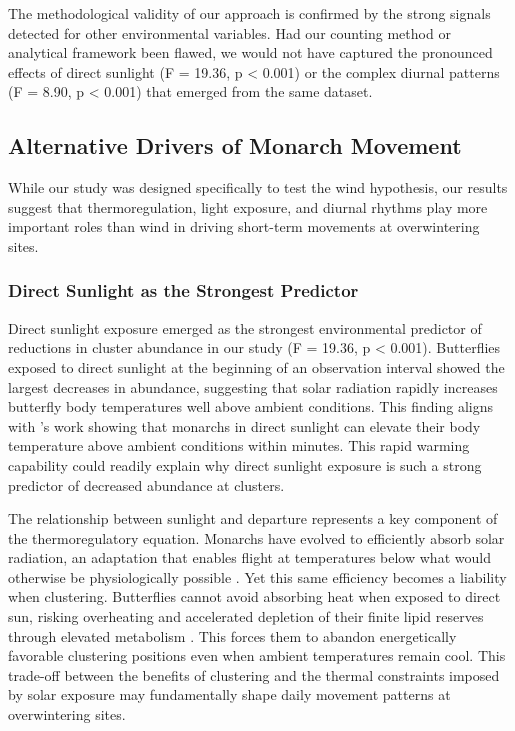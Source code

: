 The methodological validity of our approach is confirmed by the strong signals detected for other environmental variables. Had our counting method or analytical framework been flawed, we would not have captured the pronounced effects of direct sunlight (F = 19.36, p < 0.001) or the complex diurnal patterns (F = 8.90, p < 0.001) that emerged from the same dataset.

\subsection{Alternative Drivers of Monarch Movement}

While our study was designed specifically to test the wind hypothesis, our results suggest that thermoregulation, light exposure, and diurnal rhythms play more important roles than wind in driving short-term movements at overwintering sites.

\subsubsection{Direct Sunlight as the Strongest Predictor}

Direct sunlight exposure emerged as the strongest environmental predictor of reductions in cluster abundance in our study (F = 19.36, p < 0.001). Butterflies exposed to direct sunlight at the beginning of an observation interval showed the largest decreases in abundance, suggesting that solar radiation rapidly increases butterfly body temperatures well above ambient conditions. This finding aligns with \citeauthor{mastersMonarchButterflyDanaus1988}'s work showing that monarchs in direct sunlight can elevate their body temperature above ambient conditions within minutes. This rapid warming capability could readily explain why direct sunlight exposure is such a strong predictor of decreased abundance at clusters.

The relationship between sunlight and departure represents a key component of the thermoregulatory equation. Monarchs have evolved to efficiently absorb solar radiation, an adaptation that enables flight at temperatures below what would otherwise be physiologically possible \autocite{mastersMonarchButterflyDanaus1988}. Yet this same efficiency becomes a liability when clustering. Butterflies cannot avoid absorbing heat when exposed to direct sun, risking overheating and accelerated depletion of their finite lipid reserves through elevated metabolism \autocite{mastersMonarchButterflyDanaus1988}. This forces them to abandon energetically favorable clustering positions even when ambient temperatures remain cool. This trade-off between the benefits of clustering and the thermal constraints imposed by solar exposure may fundamentally shape daily movement patterns at overwintering sites.

